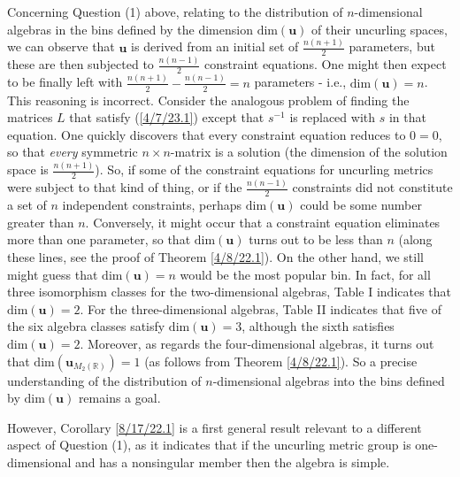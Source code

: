 \documentclass{amsart}
\numberwithin{equation}{section}
\theoremstyle{definition}
\numberwithin{theorem}{section}
\begin{document}
Concerning Question (1) above, relating to the distribution of $n$-dimensional algebras in the bins defined by the dimension $\text{dim}(\mathbf{u})$ of their uncurling spaces, we can observe that $\mathbf{u}$ is derived from an initial set of $\frac{n(n+1)}{2}$ parameters, but these are then subjected to  $\frac{n(n-1)}{2}$ constraint equations.  One might then expect to be finally left with $\frac{n(n+1)}{2} - \frac{n(n-1)}{2} = n$ parameters - i.e., $\text{dim}(\mathbf{u}) = n$.  This reasoning is incorrect.  Consider the analogous problem of finding the matrices $L$ that satisfy (\ref{4/7/23.1}) except that $s^{-1}$ is replaced with $s$ in that equation.  One quickly discovers that every constraint equation reduces to $0=0$, so that {\it every} symmetric $n\times n$-matrix is a solution (the dimension of the solution space is $\frac{n(n+1)}{2}$).  So, if some of the constraint equations for uncurling metrics were subject to  that kind of thing, or if the $\frac{n(n-1)}{2}$ constraints did not constitute a set of $n$ independent constraints, perhaps $\text{dim}(\mathbf{u})$ could be some number greater than $n$.  Conversely, it might occur that a constraint equation eliminates more than one parameter, so that $\text{dim}(\mathbf{u})$ turns out to be less than $n$ (along these lines, see the proof of Theorem \ref{4/8/22.1}).  On the other hand, we still might guess that $\text{dim}(\mathbf{u}) = n$ would be the most popular bin.  In fact, for all three isomorphism classes for the two-dimensional algebras, Table I indicates that $\text{dim}(\mathbf{u}) = 2$.  For the three-dimensional algebras, Table II indicates that five of the six algebra classes satisfy $\text{dim}(\mathbf{u}) = 3$, although the sixth satisfies $\text{dim}(\mathbf{u}) = 2$.  Moreover, as regards the four-dimensional algebras, it turns out that $\text{dim}(\mathbf{u}_{M_2(\mathbb{R})}) = 1$ (as follows from Theorem \ref{4/8/22.1}). So a precise understanding of the distribution of $n$-dimensional algebras into the bins defined by $\text{dim}(\mathbf{u})$ remains a goal.  

However, Corollary \ref{8/17/22.1} is a first general result relevant to a different aspect of Question (1), as it indicates that if the uncurling metric group is one-dimensional and has a nonsingular member then the algebra is simple.  
\end{document}
